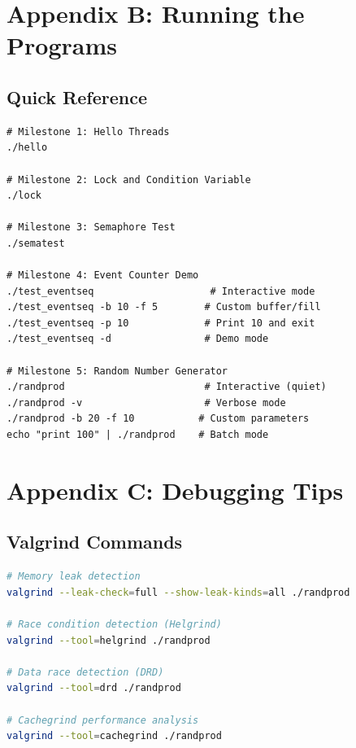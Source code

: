 \documentclass[12pt,a4paper]{article}
\begin{document}
\clearpage

\section*{Appendix B: Running the Programs}

\subsection*{Quick Reference}

\begin{tcolorbox}[colback=gray!5!white,colframe=gray!75!black,title=Command Reference]
\begin{verbatim}
# Milestone 1: Hello Threads
./hello

# Milestone 2: Lock and Condition Variable
./lock

# Milestone 3: Semaphore Test
./sematest

# Milestone 4: Event Counter Demo
./test_eventseq                    # Interactive mode
./test_eventseq -b 10 -f 5        # Custom buffer/fill
./test_eventseq -p 10             # Print 10 and exit
./test_eventseq -d                # Demo mode

# Milestone 5: Random Number Generator
./randprod                        # Interactive (quiet)
./randprod -v                     # Verbose mode
./randprod -b 20 -f 10           # Custom parameters
echo "print 100" | ./randprod    # Batch mode
\end{verbatim}
\end{tcolorbox}

\clearpage

\section*{Appendix C: Debugging Tips}

\subsection*{Valgrind Commands}

\begin{lstlisting}[language=bash, caption={Memory and Thread Safety Checks}]
# Memory leak detection
valgrind --leak-check=full --show-leak-kinds=all ./randprod

# Race condition detection (Helgrind)
valgrind --tool=helgrind ./randprod

# Data race detection (DRD)
valgrind --tool=drd ./randprod

# Cachegrind performance analysis
valgrind --tool=cachegrind ./randprod
\end{lstlisting}
\end{document}
